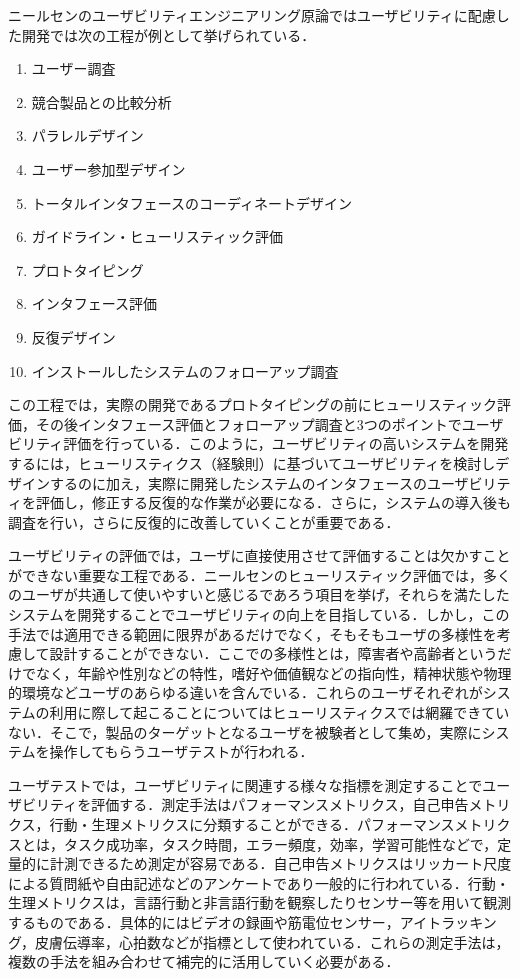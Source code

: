 ニールセンのユーザビリティエンジニアリング原論ではユーザビリティに配慮した開発では次の工程が例として挙げられている\cite{nielsen2002}．
\begin{enumerate}
  \item ユーザー調査
  \item 競合製品との比較分析
  \item パラレルデザイン
  \item ユーザー参加型デザイン
  \item トータルインタフェースのコーディネートデザイン
  \item ガイドライン・ヒューリスティック評価
  \item プロトタイピング
  \item インタフェース評価
  \item 反復デザイン
  \item インストールしたシステムのフォローアップ調査
\end{enumerate}
この工程では，実際の開発であるプロトタイピングの前にヒューリスティック評価，その後インタフェース評価とフォローアップ調査と3つのポイントでユーザビリティ評価を行っている．このように，ユーザビリティの高いシステムを開発するには，ヒューリスティクス（経験則）に基づいてユーザビリティを検討しデザインするのに加え，実際に開発したシステムのインタフェースのユーザビリティを評価し，修正する反復的な作業が必要になる．さらに，システムの導入後も調査を行い，さらに反復的に改善していくことが重要である．

ユーザビリティの評価では，ユーザに直接使用させて評価することは欠かすことができない重要な工程である．ニールセンのヒューリスティック評価\cite{nielsen1990}では，多くのユーザが共通して使いやすいと感じるであろう項目を挙げ，それらを満たしたシステムを開発することでユーザビリティの向上を目指している．しかし，この手法では適用できる範囲に限界があるだけでなく，そもそもユーザの多様性を考慮して設計することができない．ここでの多様性とは，障害者や高齢者というだけでなく，年齢や性別などの特性，嗜好や価値観などの指向性，精神状態や物理的環境などユーザのあらゆる違いを含んでいる\cite{kurosu2013}．これらのユーザそれぞれがシステムの利用に際して起こることについてはヒューリスティクスでは網羅できていない．そこで，製品のターゲットとなるユーザを被験者として集め，実際にシステムを操作してもらうユーザテストが行われる．

ユーザテストでは，ユーザビリティに関連する様々な指標を測定することでユーザビリティを評価する．測定手法はパフォーマンスメトリクス，自己申告メトリクス，行動・生理メトリクスに分類することができる\cite{tullis2014}．パフォーマンスメトリクスとは，タスク成功率，タスク時間，エラー頻度，効率，学習可能性などで，定量的に計測できるため測定が容易である．自己申告メトリクスはリッカート尺度による質問紙や自由記述などのアンケートであり一般的に行われている．行動・生理メトリクスは，言語行動と非言語行動を観察したりセンサー等を用いて観測するものである．具体的にはビデオの録画や筋電位センサー，アイトラッキング，皮膚伝導率，心拍数などが指標として使われている\cite{tullis2014}．これらの測定手法は，複数の手法を組み合わせて補完的に活用していく必要がある．

